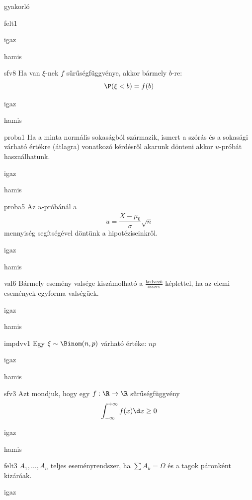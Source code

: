 \documentclass[12pt]{article}
\begin{document}
\begin{quiz}{gyakorló}
\begin{multi}[feedback={Def.+$P(AB)=P(A)$ a feltételekből.}]{felt1}
\item* igaz
\item hamis
\end{multi}
\begin{multi}[feedback={Def.}]{sfv8}
Ha van $\xi$-nek $f$ sűrűségfüggvénye, akkor bármely $b$-re:
$$
\P(\xi<b)=f(b)
$$
\item igaz
\item* hamis
\end{multi}
\begin{multi}[feedback={Ezek az $u$-próba használatának előzményei.}]{proba1}
Ha a minta normális sokaságból származik, ismert a szórás és a sokasági várható értékre (átlagra) vonatkozó kérdésről 
akarunk dönteni akkor $u$-próbát használhatunk.
\item* igaz
\item hamis
\end{multi}
\begin{multi}[feedback={A fenti formula az $u$-próba ún. próbastatisztikája.}]{proba5}
Az $u$-próbánál a 
$$
u=\frac{\overline{X}-\mu_0}{\sigma}\sqrt{n}
$$
mennyiség segítségével döntünk a hipotéziseinkről.
\item* igaz
\item hamis
\end{multi}
\begin{multi}[feedback={Additívitás.}]{val6}
Bármely esemény valsége kiszámolható a $\frac{\text{kedvező}}{\text{összes}}$ képlettel, ha az elemi események 
egyforma valségűek.
\item* igaz
\item hamis
\end{multi}
\begin{multi}[feedback={$\xi=\xi_1+\ldots+\xi_n$, ahol $\xi_k$ Bernoulli és $\E(\xi)=p$+additívitás}]{impdvv1}
Egy $\xi\sim \Binom(n,p)$ várható értéke: $np$
\item* igaz
\item hamis
\end{multi}
\begin{multi}[feedback={$f\ge 0$ fontos (monoton nemcsökkenő $F$-nek a deriváltja)}]{sfv3}
Azt mondjuk, hogy egy $f:\R\to \R$ sűrűségfüggvény 
$$
\int_{-\infty}^{+\infty}f(x)\d x\ge 0
$$
\item igaz
\item* hamis
\end{multi}
\begin{multi}[feedback={Def.}]{felt3}
$A_1,\ldots,A_n$ teljes eseményrendszer, ha $\sum A_k=\Omega$ és a tagok páronként kizáróak.
\item* igaz

\end{multi}
\end{quiz}
\end{document}
